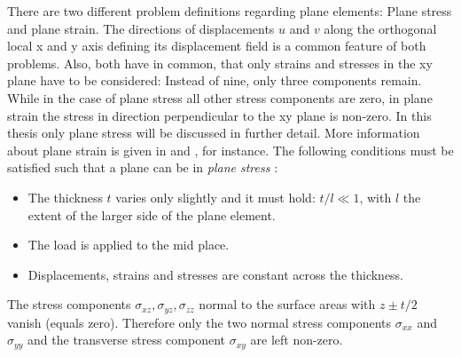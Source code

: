   There are two different problem definitions regarding plane elements: Plane stress and plane strain. The directions of displacements $u$ and $v$ along the orthogonal local x and y axis defining its displacement field is a common feature of both problems. Also, both have in common, that only strains and stresses in the xy plane have to be considered: Instead of nine, only three components remain. While in the case of plane stress all other stress components are zero, in plane strain the stress in direction perpendicular to the xy plane is non-zero. In this thesis only plane stress will be discussed in further detail. More information about plane strain is given in \cite{zienkiewicz2000finite} and \cite{braess2007finite}, for instance.
  The following conditions must be satisfied such that a plane can be in \textit{plane stress} \cite{steinke2005finite}:
  \begin{itemize}
  	\item The thickness $t$ varies only slightly and it must hold: $t/l \ll 1$, with $l$ the extent of the larger side of the plane element.
  	\item The load is applied to the mid place.
  	\item Displacements, strains and stresses are constant across the thickness.
  \end{itemize}
  The stress components $\sigma_{xz},\sigma_{yz},\sigma_{zz}$ normal to the surface areas with $z \pm t/2$ vanish (equals zero). Therefore only the two normal stress components $\sigma_{xx}$ and $\sigma_{yy}$ and the transverse stress component $\sigma_{xy}$ are left non-zero.
    
